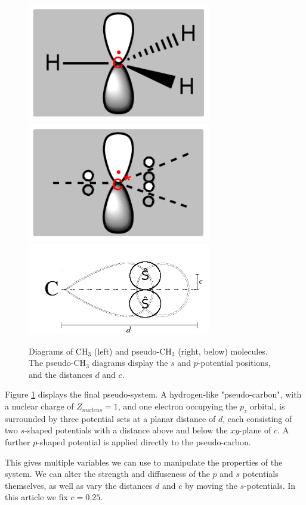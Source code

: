 \documentclass[journal=jctcce,manuscript=article]{achemso}
\begin{document}
\begin{figure}[ht]
\includegraphics[width=8cm]{ch3.png}
\includegraphics[width=8cm]{pseudoch3.png}
\includegraphics[width=8cm]{tm_sp2_potentials.png}
\caption{Diagrams of CH\(_{3}\) (left) and pseudo-CH\(_{3}\) (right, below) molecules. The pseudo-CH\(_{3}\) diagrams display the \(s\) and \(p\)-potential positions, and the distances \(d\) and \(c\).}
\label{figure:ref_pseudo_diagram}
\end{figure}

Figure \ref{figure:ref_pseudo_diagram} displays the final pseudo-system. A hydrogen-like "pseudo-carbon", with a nuclear charge of \(Z_{nucleus} = 1\), and one electron occupying the \(p_{z}\) orbital, is surrounded by three potential sets at a planar distance of \(d\), each consisting of two \(s\)-shaped potentials with a distance above and below the \(xy\)-plane of \(c\). A further \(p\)-shaped potential is applied directly to the pseudo-carbon.

This gives multiple variables we can use to manipulate the properties of the system. We can alter the strength and diffuseness of the \(p\) and \(s\) potentials themselves, as well as vary the distances \(d\) and \(c\) by moving the \(s\)-potentials. In this article we fix \(c = 0.25\).
\end{document}
